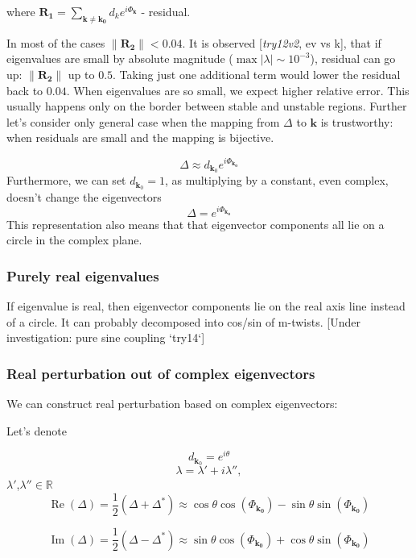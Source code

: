 \documentclass[a4paper,12pt]{article}
\renewcommand*{\Re}{\operatorname{Re}}
\renewcommand*{\Im}{\operatorname{Im}}
\renewcommand*{\vec}[1]{\mathbf{#1}}
\newcommand*{\D}{\Delta}%
\begin{document}
where $\mathbf{R_1} = \sum_{\mathbf{\vec{k} \neq \mathbf{k_0}}} d_k e^{i \Phi_\vec{k}}$ - residual.

In most of the cases $\lVert \mathbf{R_2} \rVert < 0.04$. It is observed [\textit{try12v2}, ev vs k], that if eigenvalues are small by absolute magnitude ($\max|\lambda| \sim  10^{-3}$), residual can go up: $\lVert \mathbf{R_2} \rVert$ up to $0.5$. Taking just one additional term would lower the residual back to $0.04$. When eigenvalues are so small, we expect higher relative error. This usually happens only on the border between stable and unstable regions. Further let's consider only general case when the mapping from $\D$ to $\vec{k}$ is trustworthy: when residuals are small and the mapping is bijective.

\begin{equation}
\D \approx d_{\vec{k}_0} e^{i \Phi_\mathbf{k_0}}
\end{equation}
Furthermore, we can set $d_{\vec{k}_0} = 1$, as multiplying by a constant, even complex, doesn't change the eigenvectors 
\begin{equation}
\D = e^{i \Phi_\mathbf{k_0}} 
\label{eqn:delta_to_k}
\end{equation}
This representation also means that that eigenvector components all lie on a circle in the complex plane. 
\subsubsection{Purely real eigenvalues}

If eigenvalue is real, then eigenvector components lie on the real axis line instead of a circle. It can probably decomposed into cos/sin of m-twists. [Under investigation: pure sine coupling `try14`]

\subsubsection{Real perturbation out of complex eigenvectors}

We can construct real perturbation based on complex eigenvectors:


Let's denote

$$
d_{\vec{k}_0} = e^{i \theta}
$$
$$
\lambda = \lambda' + i \lambda'',
$$
$\lambda'$,$\lambda'' \in \mathbb{R}$
$$
\Re(\D)
= \frac{1}{2} ( \D + \D^*) 
\approx  \cos \theta \cos(\Phi_{\mathbf{k_0}}) - \sin \theta \sin(\Phi_{\mathbf{k_0}})
$$

$$
\Im(\D)
= \frac{1}{2} ( \D - \D^*)
\approx  \sin \theta \cos(\Phi_{\mathbf{k_0}}) +  \cos \theta \sin(\Phi_{\mathbf{k_0}})
$$
\end{document}
